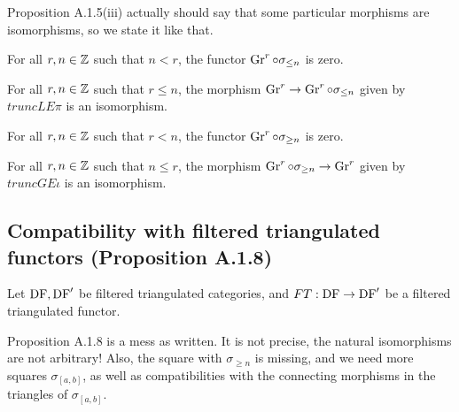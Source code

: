 Proposition A.1.5(iii) actually should say that some particular morphisms are isomorphisms,
so we state it like that.

\begin{proposition}
\label{prop-Gr-truncLE1}

For all $r,n\in\mathbb{Z}$ such that $n < r$, the functor $\operatorname{Gr}^r\circ\sigma_{\le n}$ is zero.

\end{proposition}

\begin{proposition}
\label{prop-Gr-truncLE2}

For all $r,n\in\mathbb{Z}$ such that $r \le n$, the morphism $\operatorname{Gr}^r\to\operatorname{Gr}^r\circ\sigma_{\le n}$
given by $truncLEπ$ is an isomorphism.

\end{proposition}

\begin{proposition}
\label{prop-Gr-truncGE1}

For all $r,n\in\mathbb{Z}$ such that $r < n$, the functor $\operatorname{Gr}^r\circ\sigma_{\ge n}$ is zero.

\end{proposition}

\begin{proposition}
\label{prop-Gr-truncGE2}

For all $r,n\in\mathbb{Z}$ such that $n \le r$, the morphism $\operatorname{Gr}^r\circ\sigma_{\ge n}\to\operatorname{Gr}^r$
given by $truncGEι$ is an isomorphism.

\end{proposition}



\subsection{Compatibility with filtered triangulated functors (Proposition A.1.8)}

Let $\operatorname{DF},\operatorname{DF}'$ be filtered triangulated categories, and $FT:\operatorname{DF}\to\operatorname{DF}'$ be a filtered 
triangulated functor.

Proposition A.1.8 is a mess as written.
It is not precise, the natural isomorphisms are not arbitrary!
Also, the square with $\sigma_{\ge n}$ is missing, and we need more squares
$\sigma_{[a,b]}$, as well as compatibilities with the connecting
morphisms in the triangles of $\sigma_{[a,b]}$.

